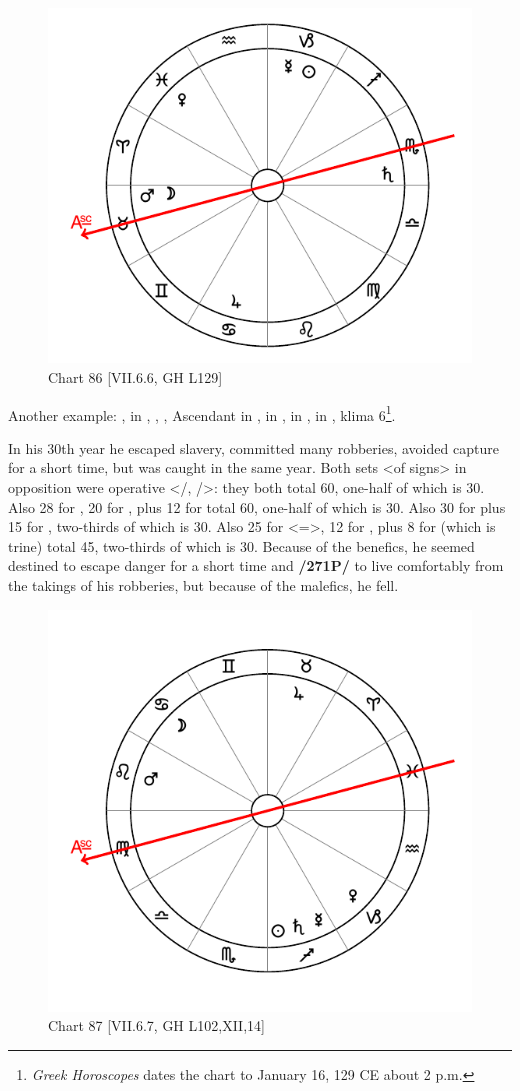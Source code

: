 \newpage
\begin{figure}
\centering
\vspace{0pt}
\includegraphics[width=.68\textwidth]{charts/7_6_06}
\caption{Chart 86 [VII.6.6, GH L129]}
\label{fig:chart86}
\end{figure} 

Another example: \Sun, \Mercury\xspace in \Capricorn, \Moon, \Mars, Ascendant in \Taurus, \Saturn\xspace in \Scorpio, \Jupiter\xspace in \Cancer, \Venus\xspace in \Pisces, klima 6\footnote{\textit{Greek Horoscopes} dates the chart to January 16, 129 CE about 2 p.m.}.

In his 30th year he escaped slavery, committed many robberies, avoided capture for a short time, but was caught in the same year. Both sets <of signs> in opposition were operative <\Taurus/\Scorpio, \Cancer/\Capricorn>: they both total 60, one-half of which is 30. Also 28 for \Capricorn, 20 for \Mercury, plus 12 for \Jupiter\xspace total 60, one-half of which is 30. Also 30 for \Saturn\xspace plus 15 for \Mars, two-thirds of which is 30. Also 25 for \Cancer\xspace <=\Moon>, 12 for \Jupiter, plus
8 for \Venus\xspace (which is trine) total 45, two-thirds of which is 30. Because of the benefics, he seemed destined to escape danger for a short time and \textbf{/271P/} to live comfortably from the takings of his robberies, but because of the malefics, he fell.

\newpage
\begin{figure}
\centering
\vspace{0pt}
\includegraphics[width=.68\textwidth]{charts/7_6_07}
\caption{Chart 87 [VII.6.7, GH L102,XII,14] }
\label{fig:chart87}
\end{figure} 

